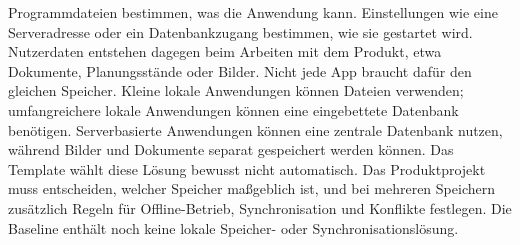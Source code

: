 \begin{beginnerstatement}

Programmdateien bestimmen, was die Anwendung kann. Einstellungen wie eine
Serveradresse oder ein Datenbankzugang bestimmen, wie sie gestartet wird.
Nutzerdaten entstehen dagegen beim Arbeiten mit dem Produkt, etwa Dokumente,
Planungsstände oder Bilder. Nicht jede App braucht dafür den gleichen
Speicher. Kleine lokale Anwendungen können Dateien verwenden; umfangreichere
lokale Anwendungen können eine eingebettete Datenbank benötigen.
Serverbasierte Anwendungen können eine zentrale Datenbank nutzen, während
Bilder und Dokumente separat gespeichert werden können. Das Template wählt
diese Lösung bewusst nicht automatisch. Das Produktprojekt muss entscheiden,
welcher Speicher maßgeblich ist, und bei mehreren Speichern zusätzlich Regeln
für Offline-Betrieb, Synchronisation und Konflikte festlegen. Die Baseline
enthält noch keine lokale Speicher- oder Synchronisationslösung.

\end{beginnerstatement}
